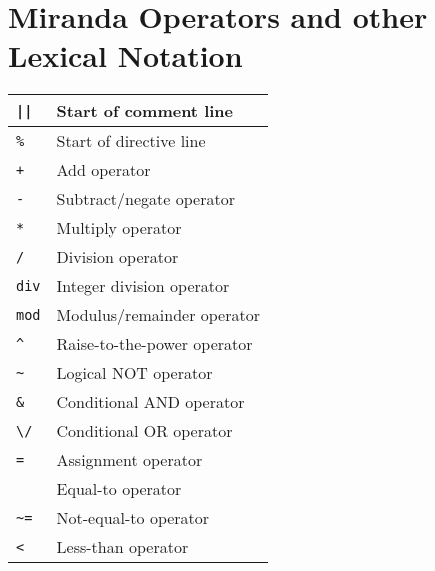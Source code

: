 \documentclass[]{article}
\begin{document}
\begin{minipage}[t][0pt]{\linewidth}

\section*{Miranda Operators and other Lexical Notation}

\centering
\begin{tabular}{ | l | l | }
	\hline
	\texttt{||}                     & Start of comment line                             \\ \hline	
	\texttt{\%}                     & Start of directive line                           \\ \hline
	\hline
	\texttt{+}                      & Add operator                                      \\ \hline
	\texttt{-}                      & Subtract/negate operator                          \\ \hline
	\texttt{*}                      & Multiply operator                                 \\ \hline
	\texttt{/}                      & Division operator                                 \\ \hline
	\texttt{div}                    & Integer division operator                         \\ \hline
	\texttt{mod}                    & Modulus/remainder operator                        \\ \hline
	\texttt{\^{}}                   & Raise-to-the-power operator                       \\ \hline
	\hline
	\texttt{\textasciitilde}        & Logical NOT operator                              \\ \hline
	\texttt{\&}                     & Conditional AND operator                          \\ \hline
	\texttt{\textbackslash/}        & Conditional OR operator                           \\ \hline
	\hline
	\texttt{=}                      & Assignment operator                               \\ 
	                                & Equal-to operator                                 \\ \hline
	\texttt{\textasciitilde=}       & Not-equal-to operator                             \\ \hline
	\texttt{<}                      & Less-than operator                                \\ \hline

\end{tabular}
\end{minipage}
\end{document}
